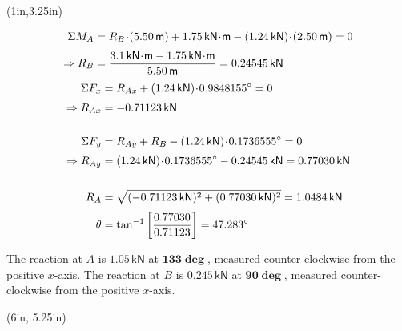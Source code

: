 \documentclass[10pt,oneside]{article}
\begin{document}
\begin{textblock*}{4.75in}(1in,3.25in)
  

  \begin{align*}
    \Sigma M_A &= R_B\cd (5.50\,\mathsf{m})+1.75\,\mathsf{kN\cd m}-(1.24\,\mathsf{kN})\cd (2.50\,\mathsf{m}) = 0 \\[0.25em]
    \Ra R_B &= \frac{3.1\,\mathsf{kN\cd m}-1.75\,\mathsf{kN\cd m}}{5.50\,\textsf{m}} = 0.24545\,\textsf{kN}
  \end{align*}
  \begin{align*}
    \Sigma F_x &= R_{Ax}+(1.24\,\textsf{kN})\!\cdot\!0.98481 55^\circ=0\\[0.25em]
    \Rightarrow R_{Ax} &= -0.71123\,\textsf{kN} \\\\
    \Sigma F_y &= R_{Ay}+R_B -(1.24\,\textsf{kN})\!\cdot\!0.17365 55^\circ=0\\[0.25em]
    \Rightarrow R_{Ay} &= (1.24\,\textsf{kN})\!\cdot\!0.17365 55^\circ-0.24545\,\textsf{kN} = 0.77030\,\textsf{kN} \\\\
    R_A &= \sqrt{(-0.71123\,\textsf{kN})^2+(0.77030\,\textsf{kN})^2} = 1.0484\,\textsf{kN}\\[0.25em]
    \theta &= \tan^{-1}\left[\frac{0.77030}{0.71123}\right] = 47.283^\circ
  \end{align*}

  \large\parb\centering 
  The reaction at $A$ is \underline{$\bm{1.05\,\mathbf{\mathsf{kN}}}$} at \underline{$\bm{133\deg}$}, measured counter-clockwise from the positive $x$-axis. 
  \parb
  The reaction at $B$ is \underline{$\bm{0.245\,\mathbf{\mathsf{kN}}}$} at \underline{$\bm{90\deg}$}, measured counter-clockwise from the positive $x$-axis.
\end{textblock*}

\begin{textblock*}{2in}(6in, 5.25in) 
\end{textblock*}
\end{document}
